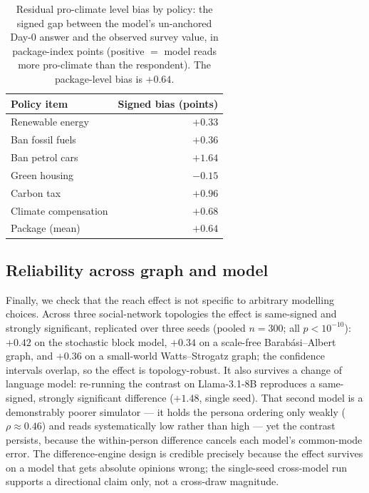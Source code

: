 \documentclass[pdflatex,sn-mathphys-num]{sn-jnl}%
\theoremstyle{thmstyleone}%
\theoremstyle{thmstyletwo}%
\theoremstyle{thmstylethree}%
\begin{document}
\begin{table}[t]
  \centering
  \footnotesize
  \caption{Residual pro-climate level bias by policy: the signed gap between the
  model's un-anchored Day-0 answer and the observed survey value, in package-index
  points (positive $=$ model reads more pro-climate than the respondent). The
  package-level bias is $+0.64$.}
  \label{tab:si-bias}
  \begin{tabular}{@{}lr@{}}
    \toprule
    Policy item & Signed bias (points) \\
    \midrule
    Renewable energy & $+0.33$ \\
    Ban fossil fuels & $+0.36$ \\
    Ban petrol cars & $+1.64$ \\
    Green housing & $-0.15$ \\
    Carbon tax & $+0.96$ \\
    Climate compensation & $+0.68$ \\
    \midrule
    Package (mean) & $+0.64$ \\
    \bottomrule
  \end{tabular}
\end{table}

\subsection{Reliability across graph and model}\label{subsec:si-reliability}

Finally, we check that the reach effect is not specific to arbitrary modelling
choices. Across three social-network topologies the effect is same-signed and
strongly significant, replicated over three seeds (pooled $n=300$; all
$p<10^{-10}$): $+0.42$ on the stochastic block model, $+0.34$ on a scale-free
Barab\'asi--Albert graph, and $+0.36$ on a small-world Watts--Strogatz graph; the
confidence intervals overlap, so the effect is topology-robust. It also survives a
change of language model: re-running the contrast on Llama-3.1-8B reproduces a
same-signed, strongly significant difference ($+1.48$, single seed). That second
model is a demonstrably poorer simulator --- it holds the persona ordering only
weakly ($\rho\approx0.46$) and reads systematically low rather than high --- yet the
contrast persists, because the within-person difference cancels each model's
common-mode error. The difference-engine design is credible precisely because the
effect survives on a model that gets absolute opinions wrong; the single-seed
cross-model run supports a directional claim only, not a cross-draw magnitude.
\end{document}
